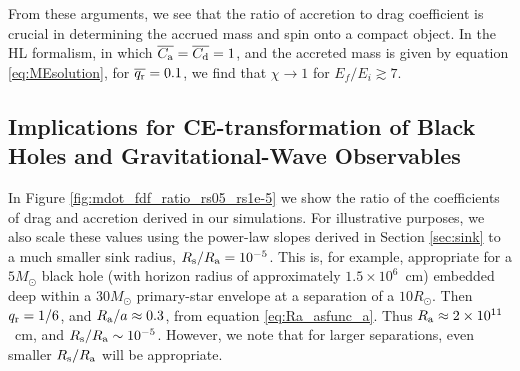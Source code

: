 From these arguments, we see that the ratio of accretion to drag coefficient is crucial in determining the accrued mass and spin onto a compact object. In the HL formalism, in which $\overline{C_{\rm a}}=\overline{C_{\rm d}}=1$, and the accreted mass is given by equation \eqref{eq:MEsolution}, for $\overline{q_{\rm r}}=0.1$, we find that $\chi\rightarrow1$ for $E_f/E_i \gtrsim 7$.

\subsection{Implications for CE-transformation of Black Holes and Gravitational-Wave Observables}\label{sec:LIGO}

In Figure \ref{fig:mdot_fdf_ratio_rs05_rs1e-5} we show the ratio of the coefficients of drag and accretion derived in our simulations. For illustrative purposes, we also scale these values using the power-law slopes derived in Section \ref{sec:sink} to a much smaller sink radius, $R_{\rm s}/R_{\rm a}= 10^{-5}$. This is, for example, appropriate for a $5M_\odot$ black hole (with horizon radius of approximately $1.5\times10^6$~cm) embedded deep within a $30 M_\odot$ primary-star envelope at a separation of a $10R_\odot$. Then $q_{\rm r} = 1/6$, and $R_{\rm a}/a\approx 0.3$, from equation \eqref{eq:Ra_asfunc_a}. Thus $R_{\rm a} \approx 2 \times 10^{11}$~cm, and $R_{\rm s}/R_{\rm a} \sim 10^{-5}$. However, we note that for larger separations, even smaller $R_{\rm s}/R_{\rm a}$ will be appropriate. 


